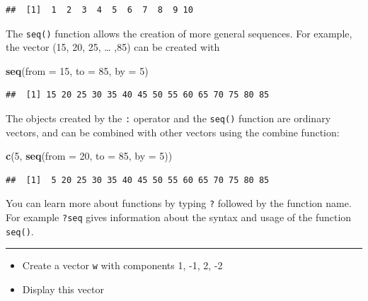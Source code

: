 \documentclass[
]{book}
\newenvironment{Shaded}{\begin{snugshade}}{\end{snugshade}}
\newcommand{\AttributeTok}[1]{\textcolor[rgb]{0.13,0.29,0.53}{#1}}
\newcommand{\DecValTok}[1]{\textcolor[rgb]{0.00,0.00,0.81}{#1}}
\newcommand{\FunctionTok}[1]{\textcolor[rgb]{0.13,0.29,0.53}{\textbf{#1}}}
\newcommand{\NormalTok}[1]{#1}
\begin{document}
\begin{verbatim}
##  [1]  1  2  3  4  5  6  7  8  9 10
\end{verbatim}

The \texttt{seq()} function allows the creation of more general
sequences. For example, the vector (15, 20, 25, \ldots{} ,85) can be created
with

\begin{Shaded}
\begin{Highlighting}[]
\FunctionTok{seq}\NormalTok{(}\AttributeTok{from =} \DecValTok{15}\NormalTok{, }\AttributeTok{to =} \DecValTok{85}\NormalTok{, }\AttributeTok{by =} \DecValTok{5}\NormalTok{)}
\end{Highlighting}
\end{Shaded}

\begin{verbatim}
##  [1] 15 20 25 30 35 40 45 50 55 60 65 70 75 80 85
\end{verbatim}

The objects created by the \texttt{:} operator and the \texttt{seq()} function
are ordinary vectors, and can be combined with other vectors using the
combine function:

\begin{Shaded}
\begin{Highlighting}[]
\FunctionTok{c}\NormalTok{(}\DecValTok{5}\NormalTok{, }\FunctionTok{seq}\NormalTok{(}\AttributeTok{from =} \DecValTok{20}\NormalTok{, }\AttributeTok{to =} \DecValTok{85}\NormalTok{, }\AttributeTok{by =} \DecValTok{5}\NormalTok{))}
\end{Highlighting}
\end{Shaded}

\begin{verbatim}
##  [1]  5 20 25 30 35 40 45 50 55 60 65 70 75 80 85
\end{verbatim}

You can learn more about functions by typing \texttt{?} followed by the
function name. For example \texttt{?seq} gives information about the
syntax and usage of the function \texttt{seq()}.

\begin{center}\rule{0.5\linewidth}{0.5pt}\end{center}

\begin{itemize}
\item
  Create a vector \texttt{w} with components 1, -1, 2, -2
\item
  Display this vector
\end{itemize}
\end{document}
